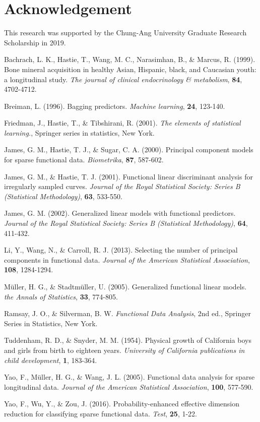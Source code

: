 \documentclass[eng]{csam}
\begin{document}
\section*{Acknowledgement}
This research was supported by the Chung-Ang University Graduate Research Scholarship in 2019.

\begin{reference}
	\item[] Bachrach, L. K., Hastie, T., Wang, M. C., Narasimhan, B., \& Marcus, R. (1999). Bone mineral acquisition in healthy Asian, Hispanic, black, and Caucasian youth: a longitudinal study. {\em The journal of clinical endocrinology \& metabolism}, {\bf 84}, 4702-4712.
	\item[] Breiman, L. (1996). Bagging predictors. {\em Machine learning}, {\bf 24}, 123-140.
	\item[] Friedman, J., Hastie, T., \& Tibshirani, R. (2001). {\em The elements of statistical learning.}, Springer series in statistics, New York.
	\item[] James, G. M., Hastie, T. J., \& Sugar, C. A. (2000). Principal component models for sparse functional data. {\em Biometrika}, {\bf 87}, 587-602.
	\item[] James, G. M., \& Hastie, T. J. (2001). Functional linear discriminant analysis for irregularly sampled curves. {\em Journal of the Royal Statistical Society: Series B (Statistical Methodology)}, {\bf 63}, 533-550.
	\item[] James, G. M. (2002). Generalized linear models with functional predictors. {\em Journal of the Royal Statistical Society: Series B (Statistical Methodology)}, {\bf 64}, 411-432.
	\item[] Li, Y., Wang, N., \& Carroll, R. J. (2013). Selecting the number of principal components in functional data. {\em Journal of the American Statistical Association}, {\bf 108}, 1284-1294.
	\item[] Müller, H. G., \& Stadtmüller, U. (2005). Generalized functional linear models. {\em the Annals of Statistics}, {\bf 33}, 774-805.
	\item[] Ramsay, J. O., \& Silverman, B. W. {\em Functional Data Analysis}, 2nd ed., Springer Series in Statistics, New York.
	\item[] Tuddenham, R. D., \& Snyder, M. M. (1954). Physical growth of California boys and girls from birth to eighteen years. {\em University of California publications in child development}, {\bf 1}, 183-364.
	\item[] Yao, F., Müller, H. G., \& Wang, J. L. (2005). Functional data analysis for sparse longitudinal data. {\em Journal of the American Statistical Association}, {\bf 100}, 577-590.
	\item[] Yao, F., Wu, Y., \& Zou, J. (2016). Probability-enhanced effective dimension reduction for classifying sparse functional data. {\em Test}, {\bf 25}, 1-22.
	
\end{reference}

%
%
\end{document}
